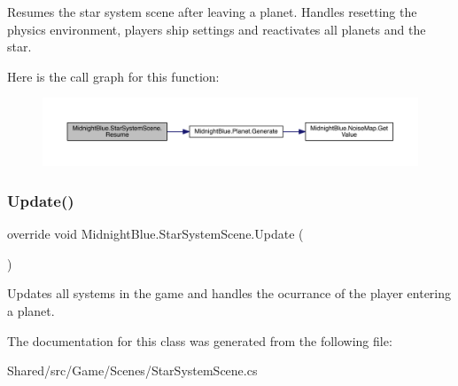 Resumes the star system scene after leaving a planet. Handles resetting the physics environment, players ship settings and reactivates all planets and the star. 

Here is the call graph for this function\+:
\nopagebreak
\begin{figure}[H]
\begin{center}
\leavevmode
\includegraphics[width=350pt]{class_midnight_blue_1_1_star_system_scene_aefbf0750a7ce153b923bcabb132e4875_cgraph}
\end{center}
\end{figure}
\hypertarget{class_midnight_blue_1_1_star_system_scene_ac36506b721064e015a9f93140681d93a}{}\label{class_midnight_blue_1_1_star_system_scene_ac36506b721064e015a9f93140681d93a} 
\subsubsection{\texorpdfstring{Update()}{Update()}}
{\footnotesize\ttfamily override void Midnight\+Blue.\+Star\+System\+Scene.\+Update (\begin{DoxyParamCaption}{ }\end{DoxyParamCaption})\hspace{0.3cm}{\ttfamily [inline]}}



Updates all systems in the game and handles the ocurrance of the player entering a planet. 



The documentation for this class was generated from the following file\+:\begin{DoxyCompactItemize}
\item 
Shared/src/\+Game/\+Scenes/Star\+System\+Scene.\+cs\end{DoxyCompactItemize}
